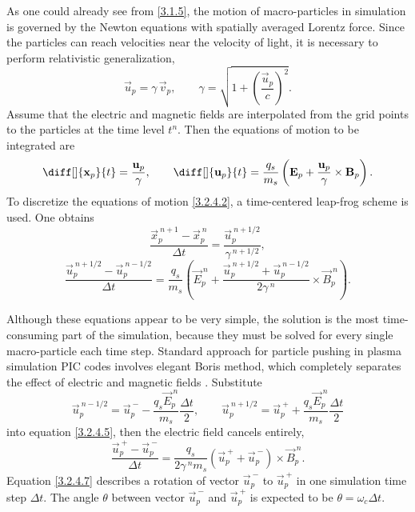 As one could already see from \ref{3.1.5}, the motion of macro-particles in simulation is governed by the Newton equations with spatially averaged Lorentz force. Since the particles can reach velocities near the velocity of light, it is necessary to perform relativistic generalization,
\begin{equation}
\label{3.2.4.1}
\vec{u}_{p} = \gamma \, \vec{v}_{p}, \qquad \gamma = \sqrt{1 + \left( \frac{\vec{u}_{p}}{c}\right)^{2}}.
\end{equation}
Assume that the electric and magnetic fields are interpolated from the grid points to the particles at the time level $ t^{n} $. Then the equations of motion to be integrated are
\begin{equation}
\label{3.2.4.2}
\diff[]{\vec{x}_{p}}{t} = \frac{\vec{u}_{p}}{\gamma}, \qquad \diff[]{\vec{u}_{p}}{t} = \frac{q_{s}}{m_{s}} \left(\vec{E}_{p} + \frac{\vec{u}_{p}}{\gamma} \times \vec{B}_{p} \right).
\end{equation}
To discretize the equations of motion \ref{3.2.4.2}, a time-centered leap-frog scheme is used. One obtains
\begin{equation}
\label{3.2.4.4}
\frac{\vec{x}_{p}^{\:n+1} - \vec{x}_{p}^{\:n}}{\Delta t} = \frac{\vec{u}_{p}^{\:n + 1/2}}{\gamma^{\:n+1/2}},
\end{equation}
\begin{equation}
\label{3.2.4.5}
\frac{\vec{u}_{p}^{\:n+1/2} - \vec{u}_{p}^{\:n-1/2}}{\Delta t} = \frac{q_{s}}{m_{s}} \left( \vec{E}_{p}^{\:n} + \frac{\vec{u}_{p}^{\:n+1/2} + \vec{u}_{p}^{\:n-1/2}}{2 \gamma^{\:n}} \times \vec{B}_{p}^{\:n} \right).
\end{equation}

Although these equations appear to be very simple, the solution is the most time-consuming part of the simulation, because they must be solved for every single macro-particle each time step. Standard approach for particle pushing in plasma simulation PIC codes involves elegant Boris method, which completely separates the effect of electric and magnetic fields \cite{birdsall}. Substitute
\begin{equation}
\label{3.2.4.6}
\vec{u}_{p}^{\:n-1/2} = \vec{u}_{p}^{\:-} - \frac{q_{s} \vec{E}_{p}^{\:n}}{m_{s}} \frac{\Delta t}{2}, \qquad \vec{u}_{p}^{\:n+1/2} = \vec{u}_{p}^{\:+} + \frac{q_{s} \vec{E}_{p}^{\:n}}{m_{s}} \frac{\Delta t}{2}
\end{equation}
into equation \ref{3.2.4.5}, then the electric field cancels entirely,
\begin{equation}
\label{3.2.4.7}
\frac{\vec{u}_{p}^{\:+} - \vec{u}_{p}^{\:-}}{\Delta t} = \frac{q_{s}}{2 \gamma^{\:n} m_{s}} \left(\vec{u}_{p}^{\:+} + \vec{u}_{p}^{\:-}\right)\times \vec{B}_{p}^{\:n}. 
\end{equation}
Equation \ref{3.2.4.7} describes a rotation of vector $ \vec{u}_{p}^{\:-} $ to $ \vec{u}_{p}^{\:+} $ in one simulation time step $ \Delta t $. The angle $ \theta $ between vector $ \vec{u}_{p}^{\:-} $ and $ \vec{u}_{p}^{\:+} $ is expected to be $ \theta = \omega_{c} \Delta t $.

